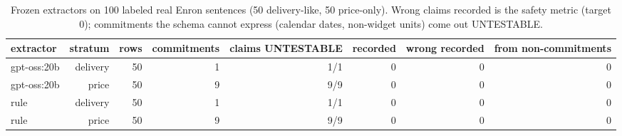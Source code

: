 \begin{table}[t]
\centering
\small
\caption{Frozen extractors on 100 labeled real Enron sentences (50 delivery-like, 50 price-only). Wrong claims recorded is the safety metric (target 0); commitments the schema cannot express (calendar dates, non-widget units) come out UNTESTABLE.}
\label{tab:enron}
\begin{tabular}{lrrrrrrr}
\toprule
extractor & stratum & rows & commitments & claims UNTESTABLE & recorded & wrong recorded & from non-commitments \\
\midrule
gpt-oss:20b & delivery & 50 & 1 & 1/1 & 0 & 0 & 0 \\
gpt-oss:20b & price & 50 & 9 & 9/9 & 0 & 0 & 0 \\
rule & delivery & 50 & 1 & 1/1 & 0 & 0 & 0 \\
rule & price & 50 & 9 & 9/9 & 0 & 0 & 0 \\
\bottomrule
\end{tabular}
\end{table}
